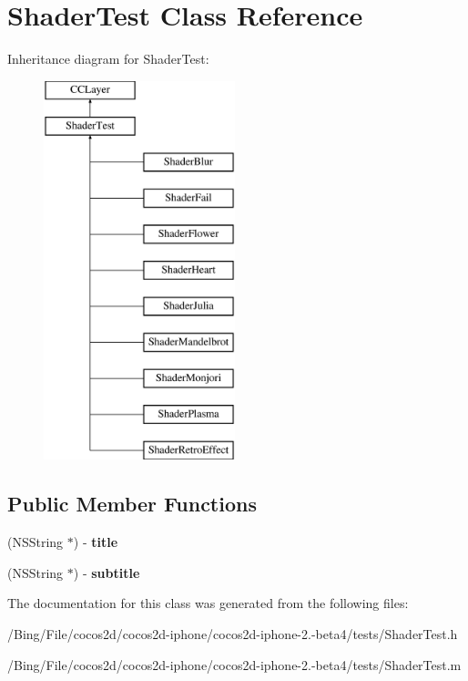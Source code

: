 \hypertarget{interface_shader_test}{\section{Shader\-Test Class Reference}
\label{interface_shader_test}
}
Inheritance diagram for Shader\-Test\-:\begin{figure}[H]
\begin{center}
\leavevmode
\includegraphics[height=11.000000cm]{interface_shader_test}
\end{center}
\end{figure}
\subsection*{Public Member Functions}
\begin{DoxyCompactItemize}
\item 
\hypertarget{interface_shader_test_ac94355f60276826308b81bd5ea5d1230}{(N\-S\-String $\ast$) -\/ {\bfseries title}}\label{interface_shader_test_ac94355f60276826308b81bd5ea5d1230}

\item 
\hypertarget{interface_shader_test_adbe09631e7140ed09e683169400e52c1}{(N\-S\-String $\ast$) -\/ {\bfseries subtitle}}\label{interface_shader_test_adbe09631e7140ed09e683169400e52c1}

\end{DoxyCompactItemize}


The documentation for this class was generated from the following files\-:\begin{DoxyCompactItemize}
\item 
/\-Bing/\-File/cocos2d/cocos2d-\/iphone/cocos2d-\/iphone-\/2.-\/beta4/tests/Shader\-Test.\-h\item 
/\-Bing/\-File/cocos2d/cocos2d-\/iphone/cocos2d-\/iphone-\/2.-\/beta4/tests/Shader\-Test.\-m\end{DoxyCompactItemize}
